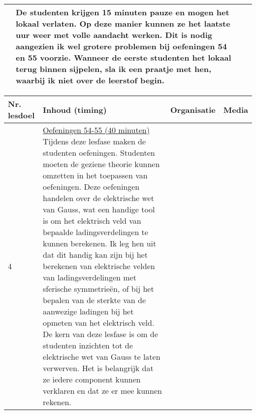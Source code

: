 \begin{landscape}
\begin{tabularx}{1.56\textwidth}{|p{1.5cm}|p{6cm}|X|p{4cm}|}
	
	&    De studenten krijgen 15 minuten pauze en mogen het lokaal verlaten. Op deze manier kunnen ze het laatste uur weer met volle aandacht werken. Dit is nodig aangezien ik wel grotere problemen bij oefeningen 54 en 55 voorzie.\newline
	Wanneer de eerste studenten het lokaal terug binnen sijpelen, sla ik een praatje met hen, waarbij ik niet over de leerstof begin. 
	& 
	\\ \hline
\end{tabularx}



\begin{tabularx}{1.56\textwidth}{|p{1.5cm}|p{6cm}|X|p{4cm}|}
	\hline
	\textbf{Nr. lesdoel } & \textbf{Inhoud (timing)}  & \textbf{Organisatie } & \textbf{Media } \\ \hline
	4\newline 5\newline 6\newline 7 \newline 8 \newline 9	&\underline{Oefeningen 54-55 (40 minuten)}\newline
	Tijdens deze lesfase maken de studenten oefeningen. Studenten moeten de geziene theorie kunnen omzetten in het toepassen van oefeningen. Deze oefeningen handelen over de elektrische wet van Gauss, wat een handige tool is om het elektrisch veld van bepaalde ladingsverdelingen te kunnen berekenen. Ik leg hen uit dat dit handig kan zijn bij het berekenen van elektrische velden van ladingsverdelingen met sferische symmetrieën, of bij het bepalen van de sterkte van de aanwezige ladingen bij het opmeten van het elektrisch veld.  \newline De kern van deze lesfase is om de studenten inzichten tot de elektrische wet van Gauss te laten verwerven. Het is belangrijk dat ze iedere component kunnen verklaren en dat ze er mee kunnen rekenen.
	

\end{tabularx}
\end{landscape}
